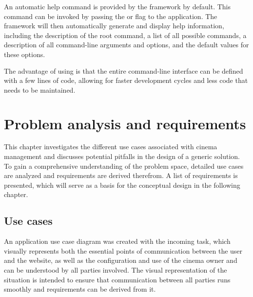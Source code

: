 An automatic help command is provided by the framework by default. This command can be invoked by passing the  or  flag to the application. The framework will then automatically generate and display help information, including the description of the root command, a list of all possible commands, a description of all command-line arguments and options, and the default values for these options. 

The advantage of using  is that the entire command-line interface can be defined with a few lines of code, allowing for faster development cycles and less code that needs to be maintained.

\chapter{Problem analysis and requirements}
\label{ch:problem-analysis}

This chapter investigates the different use cases associated with cinema management and discusses potential pitfalls in the design of a generic solution. To gain a comprehensive understanding of the problem space, detailed use cases are analyzed and requirements are derived therefrom. A list of requirements is presented, which will serve as a basis for the conceptual design in the following chapter.

\section{Use cases}\label{sec:use-cases}


An application use case diagram was created with the incoming task, which visually represents both the essential points of communication between the user and the website, as well as the configuration and use of the cinema owner and can be understood by all parties involved. The visual representation of the situation is intended to ensure that communication between all parties runs smoothly and requirements can be derived from it.

